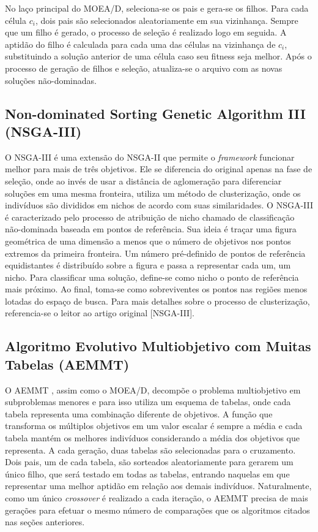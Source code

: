 No laço principal do MOEA/D, seleciona-se os pais e gera-se os filhos. Para cada célula $c_i$, dois pais são selecionados aleatoriamente em sua vizinhança. Sempre que um filho é gerado, o processo de seleção é realizado logo em seguida. A aptidão do filho é calculada para cada uma das células na vizinhança de $c_i$, substituindo a solução anterior de uma célula caso seu fitness seja melhor. Após o processo de geração de filhos e seleção, atualiza-se o arquivo com as novas soluções não-dominadas.

\subsection{Non-dominated Sorting Genetic Algorithm III (NSGA-III)}

O NSGA-III \cite{Deb2014} é uma extensão do NSGA-II que permite o \textit{framework} funcionar melhor para mais de três objetivos. Ele se diferencia do original apenas na fase de seleção, onde ao invés de usar a distância de aglomeração para diferenciar soluções em uma mesma fronteira, utiliza um método de clusterização, onde os indivíduos são divididos em nichos de acordo com suas similaridades. O NSGA-III é caracterizado pelo processo de atribuição de nicho chamado de classificação não-dominada baseada em pontos de referência. Sua ideia é traçar uma figura geométrica de uma dimensão a menos que o número de objetivos nos pontos extremos da primeira fronteira. Um número pré-definido de pontos de referência equidistantes é distribuído sobre a figura e passa a representar cada um, um nicho. Para classificar uma solução, define-se como nicho o ponto de referência mais próximo. Ao final, toma-se como sobreviventes os pontos nas regiões menos lotadas do espaço de busca. Para mais detalhes sobre o processo de clusterização, referencia-se o leitor ao artigo original [NSGA-III].

\subsection{Algoritmo Evolutivo Multiobjetivo com Muitas Tabelas (AEMMT)}

O AEMMT \cite{Brasil2013}, assim como o MOEA/D, decompõe o problema multiobjetivo em subproblemas menores e para isso utiliza um esquema de tabelas, onde cada tabela representa uma combinação diferente de objetivos. A função que transforma os múltiplos objetivos em um valor escalar é sempre a média e cada tabela mantém os melhores indivíduos considerando a média dos objetivos que representa. A cada geração, duas tabelas são selecionadas para o cruzamento. Dois pais, um de cada tabela, são sorteados aleatoriamente para gerarem um único filho, que será testado em todas as tabelas, entrando naquelas em que representar uma melhor aptidão em relação aos demais indivíduos. Naturalmente, como um único \textit{crossover} é realizado a cada iteração, o AEMMT precisa de mais gerações para efetuar o mesmo número de comparações que os algoritmos citados nas seções anteriores.

